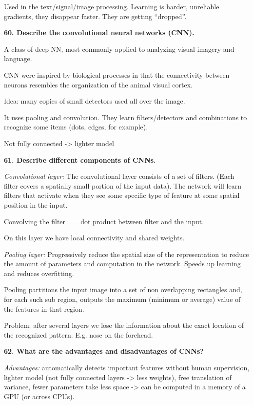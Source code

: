 Used in the text/signal/image processing. Learning is harder, unreliable
gradients, they disappear faster. They are getting ``dropped''.

\textbf{60. Describe the convolutional neural networks (CNN).}

A class of deep NN, most commonly applied to analyzing visual imagery
and language.

CNN were inspired by biological processes in that the connectivity
between neurons resembles the organization of the animal visual cortex.

Idea: many copies of small detectors used all over the image.

It uses pooling and convolution. They learn filters/detectors and
combinations to recognize some items (dots, edges, for example).

Not fully connected -\textgreater{} lighter model

\textbf{61. Describe different components of CNNs.}

\textit{Convolutional layer:} The convolutional layer consists of a
set of filters. (Each filter covers a spatially small portion of the
input data). The network will learn filters that activate when they see
some specific type of feature at some spatial position in the input.

Convolving the filter == dot product between filter and the input.

On this layer we have local connectivity and shared weights.

\textit{Pooling layer:} Progressively reduce the spatial size of the
representation to reduce the amount of parameters and computation in the
network. Speeds up learning and reduces overfitting.

Pooling partitions the input image into a set of non overlapping
rectangles and, for each such sub region, outputs the maximum (minimum
or average) value of the features in that region.

Problem: after several layers we lose the information about the exact
location of the recognized pattern. E.g. nose on the forehead.

\textbf{62. What are the advantages and disadvantages of CNNs?}

\textit{Advantages:} automatically detects important features without
human supervision, lighter model (not fully connected layers
-\textgreater{} less weights), free translation of variance, fewer
parameters take less space -\textgreater{} can be computed in a memory
of a GPU (or across CPUs).

